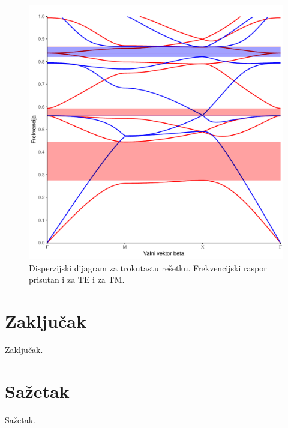 \documentclass[utf8, seminar]{fer}
\begin{document}
\begin{figure}[h]
	\centering
	\includegraphics[width = 1.0\linewidth]{./images/triangular.pdf}
	\caption{Disperzijski dijagram za trokutastu rešetku. Frekvencijski raspor
	prisutan i za TE i za TM.}
	\label{fig:triangular_band_diagram}
\end{figure}

\chapter{Zaključak}
Zaključak.




\chapter{Sažetak}
Sažetak.
\end{document}
